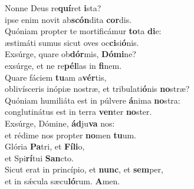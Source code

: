 \evenverse Nonne Deus re\textbf{quí}ret \textbf{i}sta?~\*\\
\evenverse ipse enim novit ab\textbf{scón}dita \textbf{cor}dis.\\
\oddverse Quóniam propter te mortificámur \textbf{to}ta \textbf{di}e:~\*\\
\oddverse æstimáti sumus sicut oves oc\textbf{ci}si\textbf{ó}nis.\\
\evenverse Exsúrge, quare ob\textbf{dór}mis, \textbf{Dó}\textbf{mi}ne?~\*\\
\evenverse exsúrge, et ne re\textbf{pél}las in \textbf{fi}nem.\\
\oddverse Quare fáciem \textbf{tu}am a\textbf{vér}tis,~\*\\
\oddverse oblivísceris inópiæ nostræ, et tribulati\textbf{ó}nis \textbf{no}stræ?\\
\evenverse Quóniam humiliáta est in púlvere \textbf{á}nima \textbf{no}stra:~\*\\
\evenverse conglutinátus est in terra \textbf{ven}ter \textbf{no}ster.\\
\oddverse Exsúrge, Dómine, \textbf{ád}ju\textbf{va} nos:~\*\\
\oddverse et rédime nos propter \textbf{no}men \textbf{tu}um.\\
\evenverse Glória \textbf{Pa}tri, et \textbf{Fí}\textbf{li}o,~\*\\
\evenverse et Spi\textbf{rí}tui \textbf{San}cto.\\
\oddverse Sicut erat in princípio, et \textbf{nunc}, et \textbf{sem}per,~\*\\
\oddverse et in sǽcula sæcu\textbf{ló}rum. \textbf{A}men.\\
